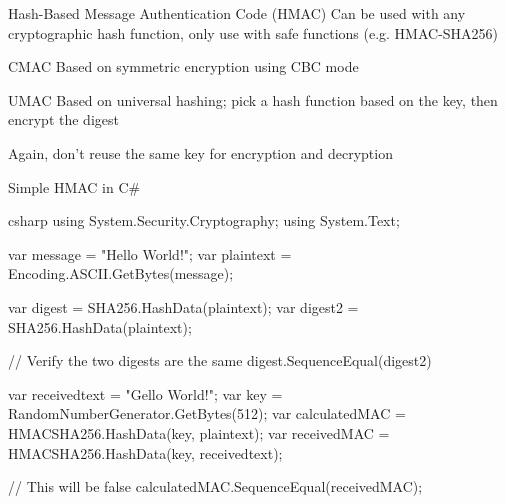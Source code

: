 \begin{dfnbox}{Hash-Based Message Authentication Code (HMAC)}{}
    Can be used with any cryptographic hash function, only use with safe functions (e.g. HMAC-SHA256)
\end{dfnbox}

\begin{dfnbox}{CMAC}{}
    Based on symmetric encryption using CBC mode
\end{dfnbox}


\begin{dfnbox}{UMAC}{}
    Based on universal hashing; pick a hash function based on the key, then encrypt the digest
\end{dfnbox}

Again, don't reuse the same key for encryption and decryption

\begin{codebox}{Simple HMAC in C\#}{}{}
    \begin{amzcode}{csharp}
using System.Security.Cryptography;
using System.Text;

var message = "Hello World!";
var plaintext = Encoding.ASCII.GetBytes(message);

var digest = SHA256.HashData(plaintext);
var digest2 = SHA256.HashData(plaintext);

// Verify the two digests are the same
digest.SequenceEqual(digest2)

var receivedtext = "Gello World!";
var key = RandomNumberGenerator.GetBytes(512);
var calculatedMAC = HMACSHA256.HashData(key, plaintext);
var receivedMAC = HMACSHA256.HashData(key, receivedtext);

// This will be false
calculatedMAC.SequenceEqual(receivedMAC);
    \end{amzcode}
\end{codebox}

